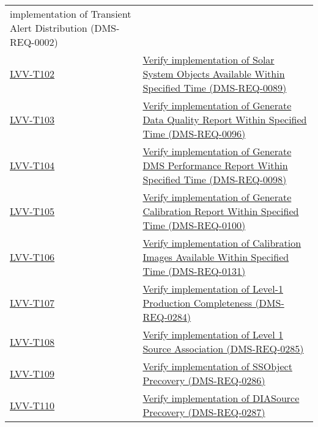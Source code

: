 \begin{longtable}[]{p{3cm}p{13cm}}
{implementation of Transient Alert Distribution
(DMS-REQ-0002)}\tabularnewline
\protect\hyperlink{lvv-t102---verify-implementation-of-solar-system-objects-available-within-specified-time-dms-req-0089}{LVV-T102}
&
\href{https://jira.lsstcorp.org/secure/Tests.jspa\#/testCase/LVV-T102}{Verify
implementation of Solar System Objects Available Within Specified Time
(DMS-REQ-0089)}\tabularnewline
\protect\hyperlink{lvv-t103---verify-implementation-of-generate-data-quality-report-within-specified-time-dms-req-0096}{LVV-T103}
&
\href{https://jira.lsstcorp.org/secure/Tests.jspa\#/testCase/LVV-T103}{Verify
implementation of Generate Data Quality Report Within Specified Time
(DMS-REQ-0096)}\tabularnewline
\protect\hyperlink{lvv-t104---verify-implementation-of-generate-dms-performance-report-within-specified-time-dms-req-0098}{LVV-T104}
&
\href{https://jira.lsstcorp.org/secure/Tests.jspa\#/testCase/LVV-T104}{Verify
implementation of Generate DMS Performance Report Within Specified Time
(DMS-REQ-0098)}\tabularnewline
\protect\hyperlink{lvv-t105---verify-implementation-of-generate-calibration-report-within-specified-time-dms-req-0100}{LVV-T105}
&
\href{https://jira.lsstcorp.org/secure/Tests.jspa\#/testCase/LVV-T105}{Verify
implementation of Generate Calibration Report Within Specified Time
(DMS-REQ-0100)}\tabularnewline
\protect\hyperlink{lvv-t106---verify-implementation-of-calibration-images-available-within-specified-time-dms-req-0131}{LVV-T106}
&
\href{https://jira.lsstcorp.org/secure/Tests.jspa\#/testCase/LVV-T106}{Verify
implementation of Calibration Images Available Within Specified Time
(DMS-REQ-0131)}\tabularnewline
\protect\hyperlink{lvv-t107---verify-implementation-of-level-1-production-completeness-dms-req-0284}{LVV-T107}
&
\href{https://jira.lsstcorp.org/secure/Tests.jspa\#/testCase/LVV-T107}{Verify
implementation of Level-1 Production Completeness
(DMS-REQ-0284)}\tabularnewline
\protect\hyperlink{lvv-t108---verify-implementation-of-level-1-source-association-dms-req-0285}{LVV-T108}
&
\href{https://jira.lsstcorp.org/secure/Tests.jspa\#/testCase/LVV-T108}{Verify
implementation of Level 1 Source Association
(DMS-REQ-0285)}\tabularnewline
\protect\hyperlink{lvv-t109---verify-implementation-of-ssobject-precovery-dms-req-0286}{LVV-T109}
&
\href{https://jira.lsstcorp.org/secure/Tests.jspa\#/testCase/LVV-T109}{Verify
implementation of SSObject Precovery (DMS-REQ-0286)}\tabularnewline
\protect\hyperlink{lvv-t110---verify-implementation-of-diasource-precovery-dms-req-0287}{LVV-T110}
&
\href{https://jira.lsstcorp.org/secure/Tests.jspa\#/testCase/LVV-T110}{Verify
implementation of DIASource Precovery (DMS-REQ-0287)}\tabularnewline

\end{longtable}
